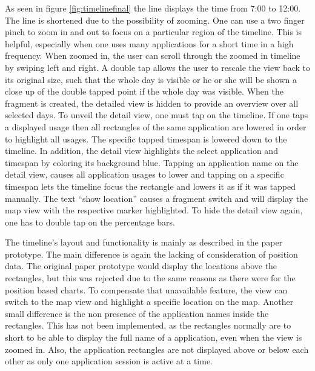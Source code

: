 As  seen in figure \ref{fig:timelinefinal} the line displays the time from 7:00 to 12:00. The line is shortened due to the possibility of zooming. One can use a two finger pinch to zoom in and out to focus on a particular region of the timeline. This is helpful, especially when one uses many applications for a short time in a high frequency. When zoomed in, the user can scroll through the zoomed in timeline by swiping left and right. A double tap allows the user to rescale the view back to its original size, such that the whole day is visible or he or she will be shown a close up of the double tapped point if the whole day was visible. When the fragment is created, the detailed view is hidden to provide an overview over all  selected days. To unveil the detail view, one must tap on the timeline. If one taps a displayed usage then all rectangles of the same application are lowered in order to highlight all usages. The specific tapped timespan is lowered down to the timeline. In addition, the detail view highlights the select application and timespan by coloring its background blue. Tapping an application name on the detail view, causes all application usages to lower and tapping on a specific timespan lets the timeline focus the rectangle and lowers it as if it was tapped manually. The text ``show location'' causes a fragment switch and will display the map view with the respective marker highlighted. To hide the detail view again, one has to double tap on the percentage bars.

The  timeline's layout and functionality is mainly as described in the paper prototype. The main difference is again the lacking of consideration of position data. The original paper prototype would display the locations above the rectangles, but this was rejected due to the same reasons as there were for the position based charts. To compensate that unavailable feature, the view can switch to the map view and highlight a specific location on the map. Another small difference is the non presence of the application names inside the rectangles. This has not been implemented, as the rectangles normally are to short to be able to display the full name of a application, even when the view is zoomed in. Also, the application rectangles are not displayed above or below each other as only one application session is active at a time.


